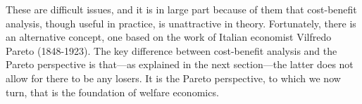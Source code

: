 These are difficult issues, and it is in large part because of them that cost-benefit analysis, though useful in practice, is unattractive in theory. Fortunately, there is an alternative concept, one based on the work of Italian economist Vilfredo Pareto (1848-1923). The key difference between cost-benefit analysis and the Pareto perspective is that---as explained in the next section---the latter does not allow for there to be any losers. It is the Pareto perspective, to which we now turn, that is the foundation of welfare economics.






